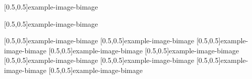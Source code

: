 



\graphicspath{{Figures/}{Figures/Iceland}}


\subtitle{Day 1}
\date{07.10.2019}


    
    
    [0.5,0.5]{example-image-b}{image}
    
    [0.5,0.5]{example-image-b}{image}
    
    [0.5,0.5]{example-image-b}{image}
%     
    [0.5,0.5]{example-image-b}{image}
%     
    [0.5,0.5]{example-image-b}{image}
%     
    [0.5,0.5]{example-image-b}{image}
%     
    [0.5,0.5]{example-image-b}{image}
%     
    [0.5,0.5]{example-image-b}{image}
%     
    [0.5,0.5]{example-image-b}{image}
%     
    [0.5,0.5]{example-image-b}{image}
%     
    [0.5,0.5]{example-image-b}{image}

